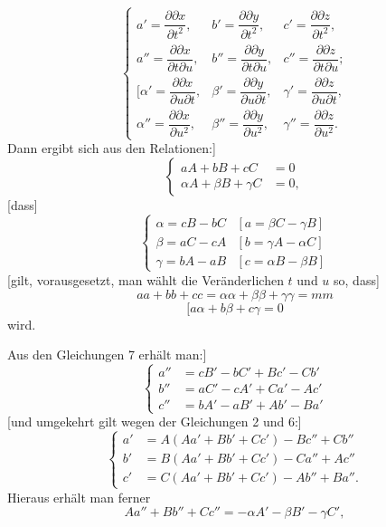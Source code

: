 %
\begin{equation}\tag*{[5]}
\left\{\begin{array}{lll}
a'=\dfrac{\partial\partial x}{\partial t^2},&b'=\dfrac{\partial\partial y}{\partial t^2},&c'=\dfrac{\partial\partial z}{\partial t^2},\\[6pt]
a''=\dfrac{\partial\partial x}{\partial t\partial u},&b''=\dfrac{\partial\partial y}{\partial t\partial u},&c''=\dfrac{\partial\partial z}{\partial t\partial u};\\[6pt]
[\alpha'=\dfrac{\partial\partial x}{\partial u\partial t},&\beta'=\dfrac{\partial\partial y}{\partial u\partial t},&\gamma'=\dfrac{\partial\partial z}{\partial u\partial t},\\[6pt]
\alpha''=\dfrac{\partial\partial x}{\partial u^2},&\beta''=\dfrac{\partial\partial y}{\partial u^2},&\gamma''=\dfrac{\partial\partial z}{\partial u^2}.
\end{array}\right.
\end{equation}
\indent Dann ergibt sich aus den Relationen:]
\begin{equation}\tag*{[6]}
\left\{\begin{aligned}aA+bB+cC&=0\\ \alpha A+\beta B+\gamma C&=0,\end{aligned}\right.
\end{equation}
[dass]
\begin{equation}\tag*{[7]}
\left\{\begin{array}{ll}
\alpha=cB-bC&[a=\beta C-\gamma B]\\
\beta=aC-cA&[b=\gamma A-\alpha C]\\
\gamma=bA-aB&[c=\alpha B-\beta B]
\end{array}\right.
\end{equation}
[gilt, vorausgesetzt, man wählt die Veränderlichen $t$ und $u$ so, dass]
\begin{equation}\tag*{[8]}aa+bb+cc=\alpha\alpha+\beta\beta+\gamma\gamma=mm\end{equation}
\begin{equation}\tag*{[9]}[a\alpha+b\beta+c\gamma=0\end{equation}
wird.

Aus den Gleichungen 7 erhält man:]
\begin{equation}\tag*{[10]}
\left\{\begin{aligned}
a''&=cB'-bC'+Bc'-Cb'\\
b''&=aC'-cA'+Ca'-Ac'\\
c''&=bA'-aB'+Ab'-Ba'
\end{aligned}\right.
\end{equation}
[und umgekehrt gilt wegen der Gleichungen 2 und 6:]
\begin{equation}\tag*{[11]}
\left\{\begin{aligned}
a'&=A(Aa'+Bb'+Cc')-Bc''+Cb''\\
b'&=B(Aa'+Bb'+Cc')-Ca''+Ac''\\
c'&=C(Aa'+Bb'+Cc')-Ab''+Ba''.
\end{aligned}\right.
\end{equation}
\indent Hieraus erhält man ferner
\[
Aa''+Bb''+Cc''=-\alpha A'-\beta B'-\gamma C',
\]
